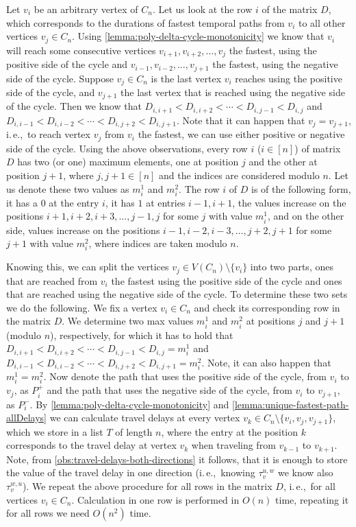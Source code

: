 \documentclass[a4paper,UKenglish,cleveref, autoref, thm-restate, anonymous]{lipics-v2021}
\newcommand{\ie}{i.\,e.,\ }
\begin{document}
Let $v_i$ be an arbitrary vertex of $C_n$. Let us look at the row $i$ of the matrix $D$, which corresponds to the durations of fastest temporal paths from $v_i$ to all other vertices $v_j \in C_n$.
Using \cref{lemma:poly-delta-cycle-monotonicity} we know that $v_i$ will reach some consecutive vertices $v_{i+1}, v_{i+2}, \dots, v_j$ the fastest, using the positive side of the cycle 
and $v_{i-1}, v_{i-2}, \dots, v_{j+1}$ the fastest, using the negative side of the cycle.
Suppose $v_j \in C_n$ is the last vertex $v_i$ reaches using the positive side of the cycle, and $v_{j+1}$ the last vertex that is reached using the negative side of the cycle.
Then we know that $D_{i,i+1} < D_{i,i+2} < \cdots< D_{i,j-1} < D_{i,j}$ and 
$D_{i,i-1} < D_{i,i-2} < \cdots < D_{i,j+2} < D_{i,j+1}$.
Note that it can happen that $v_j = v_{j+1}$, \ie to reach vertex $v_j$ from $v_i$ the fastest, we can use either positive or negative side of the cycle.
Using the above observations, every row $i$ ($i \in [n]$) of matrix $D$ has two (or one) maximum elements, one at position $j$ and the other at position $j+1$, where $j, j+1 \in [n]$ and the indices are considered modulo $n$.
Let us denote these two values as $m_i^1$ and $m_i^2$.
The row $i$ of $D$ is of the following form, it has a $0$ at the entry $i$, it has $1$ at entries $i-1, i+1$,
the values increase on the positions $i+1, i+2, i+3, \dots, j-1, j$ for some $j$ with value $m_i^1$, 
and on the other side, values increase on the positions $i-1, i-2, i-3, \dots, j+2, j+1$ for some $j+1$ with value $m_i^2$,
where indices are taken modulo $n$.

Knowing this, we can split the vertices $v_j \in V(C_n) \setminus \{v_i\}$ into two parts, ones that are reached from $v_i$ the fastest using the positive side of the cycle and ones that are reached using the negative side of the cycle.
To determine these two sets we do the following.
We fix a vertex $v_i \in C_n$ and check its corresponding row in the matrix $D$. 
We determine two max values $m_i^1$ and $m_i^2$ at positions $j$ and $j+1$ (modulo $n$), respectively,
for which it has to hold that
$D_{i,i+1} < D_{i,i+2} < \cdots< D_{i,j-1} < D_{i,j}=m_i^1$ and 
$D_{i,i-1} < D_{i,i-2} < \cdots < D_{i,j+2} < D_{i,j+1}=m_i^2$.
Note, it can also happen that $m_i^1 = m_i^2$. 
Now denote the path that uses the positive side of the cycle, from $v_i$ to $v_j$, as $P^+_i$ and
the path that uses the negative side of the cycle, from $v_i$ to $v_{j+1}$, as $P^-_i$.
By \cref{lemma:poly-delta-cycle-monotonicity} and \cref{lemma:unique-fastest-path-allDelays} we can calculate travel delays at every vertex $v_k \in C_n \setminus \{v_i, v_j, v_{j+1}\}$,
which we store in a list $T$ of length $n$,
where the entry at the position $k$ corresponds to the travel delay at vertex $v_k$ when traveling from $v_{k-1}$ to $v_{k+1}$.
Note, from \cref{obs:travel-delays-both-directions} it follows, that it is enough to store the value of the travel delay in one direction (\ie knowing $\tau_v^{u,w}$ we know also $\tau_v^{w,u}$).
We repeat the above procedure for all rows in the matrix $D$, \ie for all vertices $v_i \in C_n$.
Calculation in one row is performed in $O(n)$ time, repeating it for all rows we need $O(n^2)$ time.
\end{document}
